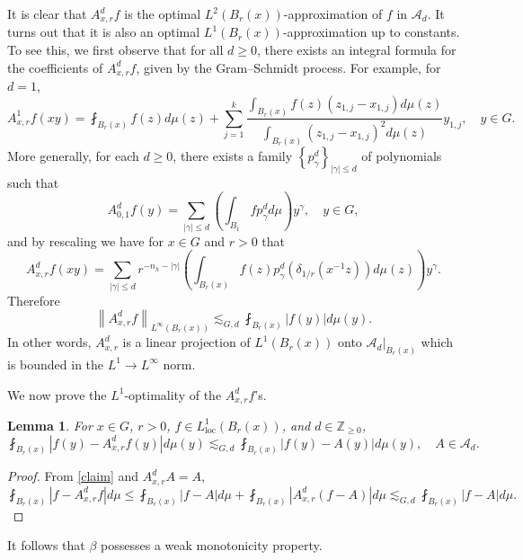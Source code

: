 \documentclass[11pt,reqno]{amsart}
\newtheorem{lemma}[theorem]{Lemma}
\newcommand{\1}{\mathbf 1}
\begin{document}
It is clear that $A^d_{x,r}f$ is the optimal $L^2\left(B_r\left(x\right)\right)$-approximation of $f$ in ${\mathcal{A}}_{d}$. It turns out that it is also an optimal $L^1\left(B_r\left(x\right)\right)$-approximation up to constants. To see this, we first observe that for all $d\ge 0$, there exists an integral formula for the coefficients of $A^d_{x,r}f$, given by the Gram--Schmidt process. For example, for $d=1$,
\begin{equation}\label{A1}
A^1_{x,r}f\left(xy\right) = \fint_{B_r\left(x\right)}f\left(z\right)d\mu\left(z\right)+ \sum_{j=1}^{k}\frac{\int_{B_r\left(x\right)} f\left(z\right)\left(z_{1,j}-x_{1,j}\right)d\mu\left(z\right)}{\int_{B_r\left(x\right)} \left(z_{1,j}-x_{1,j}\right)^2 d\mu\left(z\right)}y_{1,j}, \quad y \in G.
\end{equation}
More generally, for each $d\ge 0$, there exists a family $\left\{p^d_\gamma\right\}_{\left|\gamma\right|\le d}$ of polynomials such that
\[
A^d_{0,1}f\left(y\right)=\sum_{\left|\gamma\right|\le d}\left(\int_{B_1}fp^d_\gamma d\mu\right)y^\gamma,\quad y\in G,
\]
and by rescaling we have for $x\in G$ and $r>0$ that
\begin{equation}\label{eq:adxr-integral}
A^d_{x,r}f\left(xy\right)=\sum_{\left|\gamma\right|\le d} r^{-n_h-\left|\gamma\right|}\left(\int_{B_r\left(x\right)}f\left(z\right)p^d_\gamma\left(\delta_{1/r}\left(x^{-1}z\right)\right)d\mu\left(z\right)\right)y^\gamma.
\end{equation}
Therefore
\begin{equation}\label{claim}
\left\|A^{d}_{x,r}f\right\|_{L^\infty\left(B_r\left(x\right)\right)}\lesssim_{G,d}\fint_{B_r\left(x\right)}\left|f\left(y\right)\right|d\mu\left(y\right).
\end{equation}
In other words, $A^d_{x,r}$ is a linear projection of $L^1\left(B_r\left(x\right)\right)$ onto $\left.\mathcal{A}_d\right|_{B_r\left(x\right)}$ which is bounded in the $L^1\to L^\infty$ norm. 

We now prove the $L^1$-optimality of the $A^d_{x,r}f$'s.
\begin{lemma}\label{L1-approx}
For $x\in G$, $r>0$, $f\in L^1_{\mathrm{loc}}\left(B_r\left(x\right)\right)$, and $d\in \mathbb{Z}_{\ge 0}$,
\[
\fint_{B_r\left(x\right)}\left|f\left(y\right)-A^d_{x,r}f\left(y\right)\right|d\mu\left(y\right) \lesssim_{G,d}\fint_{B_r\left(x\right)}\left|f\left(y\right)-A\left(y\right)\right|d\mu\left(y\right),\quad A\in \mathcal{A}_d.
\]
\end{lemma}
\begin{proof}
From \eqref{claim} and $A^d_{x,r}A=A$,
\[
\fint_{B_r\left(x\right)}\left|f-A^d_{x,r}f\right|d\mu\le \fint_{B_r\left(x\right)}\left|f-A\right|d\mu+\fint_{B_r\left(x\right)}\left|A^d_{x,r}\left(f-A\right)\right|d\mu\lesssim_{G,d} \fint_{B_r\left(x\right)}\left|f-A\right|d\mu.
\]
\end{proof}
It follows that $\beta$ possesses a weak monotonicity property.
\end{document}
